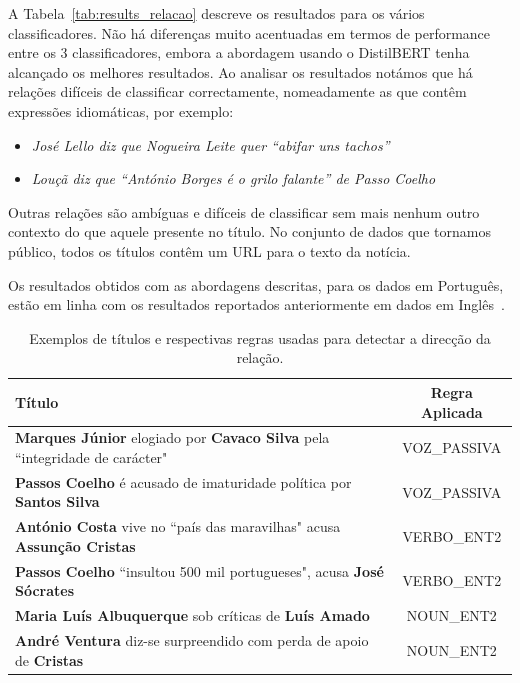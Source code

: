 \documentclass[a4paper, twocolumn, 11pt, twoside]{article}
\begin{document}
A Tabela~\ref{tab:results_relacao} descreve os resultados para os vários classificadores. Não há diferenças muito acentuadas em termos de performance entre os 3 classificadores, embora a abordagem usando o DistilBERT tenha alcançado os melhores resultados. Ao analisar os resultados notámos que há relações difíceis de classificar correctamente, nomeadamente as que contêm expressões idiomáticas, por exemplo:

\begin{itemize}
\item{\textit{José Lello diz que Nogueira Leite quer “abifar uns tachos”}}
\item{\textit{Louçã diz que “António Borges é o grilo falante” de Passo Coelho}}
\end{itemize}

Outras relações são ambíguas e difíceis de classificar sem mais nenhum outro contexto do que aquele presente no título. No conjunto de dados que tornamos público, todos os títulos contêm um URL para o texto da notícia. 

Os resultados obtidos com as abordagens descritas, para os dados em Português, estão em linha com os resultados reportados anteriormente em dados em Inglês~\citep{liang2019blames, park-etal-2021-blames}.


\begin{table}
  \centering
  \begin{tabular}{lc}
      {\bf Título} & {\bf Regra Aplicada} \\
      \hline
	  \textbf{Marques Júnior} elogiado por \textbf{Cavaco Silva} pela ``integridade de carácter" & VOZ\_PASSIVA \\
	  \textbf{Passos Coelho} é acusado de imaturidade política por \textbf{Santos Silva}  		 & VOZ\_PASSIVA \\
	  \textbf{António Costa} vive no ``país das maravilhas" acusa \textbf{Assunção Cristas}      & VERBO\_ENT2 \\
	  \textbf{Passos Coelho} ``insultou 500 mil portugueses", acusa \textbf{José Sócrates}		 & VERBO\_ENT2 \\ 
	  \textbf{Maria Luís Albuquerque} sob críticas de \textbf{Luís Amado}						 & NOUN\_ENT2 \\
	  \textbf{André Ventura} diz-se surpreendido com perda de apoio de \textbf{Cristas}			 & NOUN\_ENT2 \\

	  \hline
  \end{tabular}
  \caption{Exemplos de títulos e respectivas regras usadas para detectar a direcção da relação.}
  \label{tab:examples_patterns_direction}
\end{table}
\end{document}
